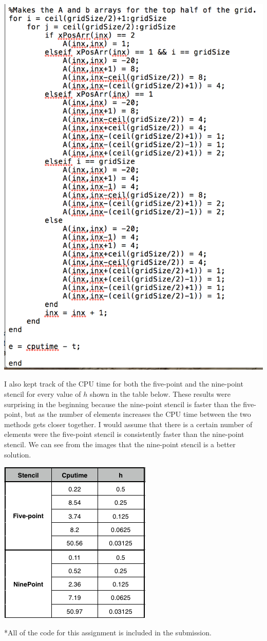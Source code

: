 \documentclass[11pt, oneside]{article}   	%
\begin{document}
\centerline{\includegraphics[scale = 0.7]{matrix9Code_2.png}} 

I also kept track of the CPU time for both the five-point and the nine-point stencil for every value of $h$ shown in the table below. These results were surprising in the beginning because the nine-point stencil is faster than the five-point, but as the number of elements increases the CPU time between the two methods gets closer together. I would assume that there is a certain number of elements were the five-point stencil is consistently faster than the nine-point stencil. We can see from the images that the nine-point stencil is a better solution. \\

\centerline{\includegraphics[scale = 0.75]{5vs9Table.png}}

*All of the code for this assignment is included in the submission.
\end{document}
